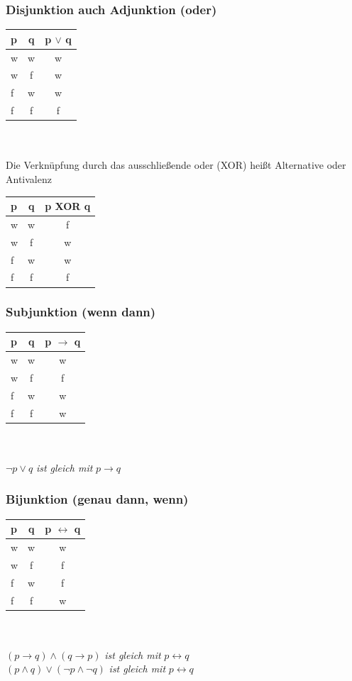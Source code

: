 \documentclass[a4paper,12pt]{scrartcl}
\begin{document}
\subsubsection{Disjunktion auch Adjunktion (oder)}
\begin{tabular}{lc|c}
  p & q & p $\vee$ q\\
  \hline
  w & w & w \\
  w & f & w \\
  f & w & w \\
  f & f & f \\
\end{tabular}
\\ 
\\ Die Verknüpfung durch das ausschließende oder (XOR) heißt Alternative oder Antivalenz \\

\begin{tabular}{lc|c}
  p & q & p XOR q\\
  \hline
  w & w & f \\
  w & f & w \\
  f & w & w \\
  f & f & f \\
\end{tabular}

\subsubsection{Subjunktion (wenn dann)}
\begin{tabular}{lc|c}
  p & q & p $\to$ q\\
  \hline
  w & w & w \\
  w & f & f \\
  f & w & w \\
  f & f & w \\
\end{tabular}
\\
\\ $\neg p \vee q$ \textit{ist gleich mit} $p \to q$

\subsubsection{Bijunktion (genau dann, wenn)}
\begin{tabular}{lc|c}
  p & q & p $\leftrightarrow$ q\\
  \hline
  w & w & w \\
  w & f & f \\
  f & w & f \\
  f & f & w \\
\end{tabular}
\\
\\ $(p \to q) \land (q \to p)$ \textit{ist gleich mit} $p \leftrightarrow q$
\\ $(p \land q) \vee (\neg p \land \neg q)$ \textit{ist gleich mit} $p \leftrightarrow q$
\end{document}
